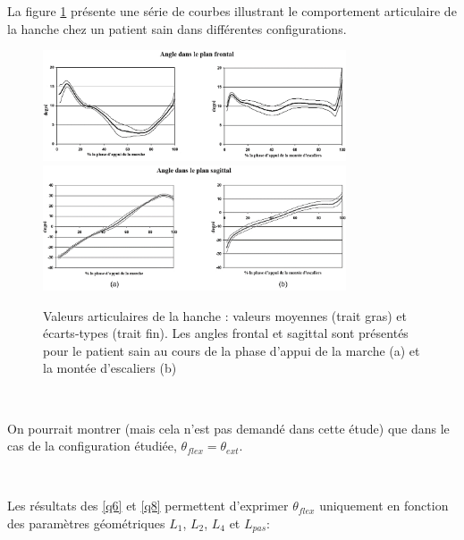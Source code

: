 
\newpage

La figure \ref{fig09} présente une série de courbes illustrant le comportement articulaire de la hanche chez un patient sain dans différentes configurations.

\begin{figure}[ht!]
	\centering\includegraphics[width=0.8\textwidth]{img/fig09a}
	\centering\includegraphics[width=0.8\textwidth]{img/fig09b}
    \caption{\label{fig09} Valeurs articulaires de la hanche : valeurs moyennes (trait gras) et écarts-types (trait fin). Les angles frontal et sagittal sont présentés pour le patient sain au cours de la phase d'appui de la marche (a) et la montée d'escaliers (b)}
\end{figure}


~\

On pourrait montrer (mais cela n'est pas demandé dans cette étude) que dans le cas de la configuration étudiée, $\theta_{flex}=\theta_{ext}$.

~\

Les résultats des \ref{q6} et \ref{q8} permettent d'exprimer $\theta_{flex}$ uniquement en fonction des paramètres géométriques $L_1$, $L_2$, $L_4$ et $L_{pas}$:

